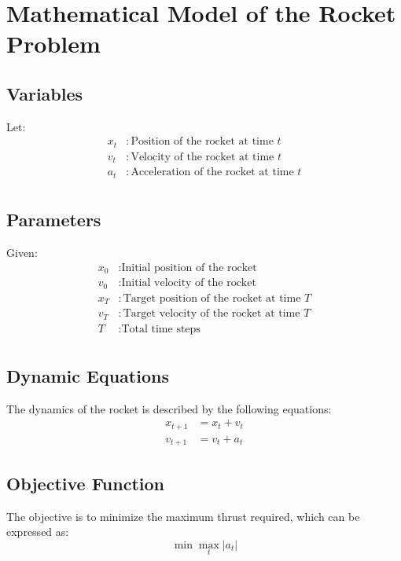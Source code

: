 \documentclass{article}
\begin{document}
\section*{Mathematical Model of the Rocket Problem}

\subsection*{Variables}
Let:
\begin{align*}
x_t & : \text{Position of the rocket at time } t \\
v_t & : \text{Velocity of the rocket at time } t \\
a_t & : \text{Acceleration of the rocket at time } t \\
\end{align*}

\subsection*{Parameters}
Given:
\begin{align*}
x_0 & : \text{Initial position of the rocket} \\
v_0 & : \text{Initial velocity of the rocket} \\
x_T & : \text{Target position of the rocket at time } T \\
v_T & : \text{Target velocity of the rocket at time } T \\
T & : \text{Total time steps} \\
\end{align*}

\subsection*{Dynamic Equations}
The dynamics of the rocket is described by the following equations:
\begin{align}
x_{t+1} &= x_t + v_t \label{eq:position} \\
v_{t+1} &= v_t + a_t \label{eq:velocity}
\end{align}

\subsection*{Objective Function}
The objective is to minimize the maximum thrust required, which can be expressed as:
\begin{equation}
\min \max_{t} |a_t| \label{eq:objective}
\end{equation}
\end{document}
